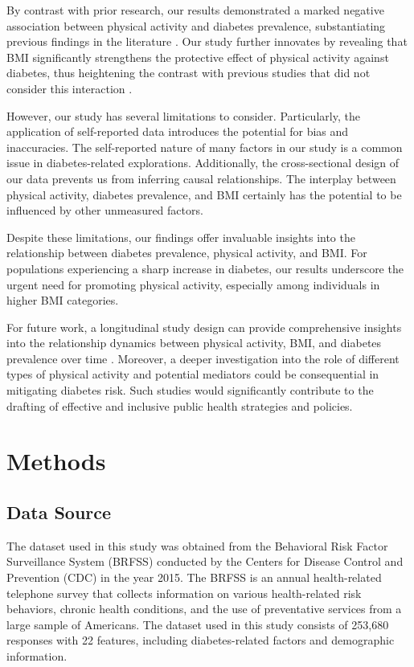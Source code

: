 \documentclass[11pt]{article}
\begin{document}
By contrast with prior research, our results demonstrated a marked negative association between physical activity and diabetes prevalence, substantiating previous findings in the literature \cite{Zhao2020PhysicalAL, Shi2013PhysicalAS}. Our study further innovates by revealing that BMI significantly strengthens the protective effect of physical activity against diabetes, thus heightening the contrast with previous studies that did not consider this interaction \cite{Bohn2015ImpactOP, Pi-Sunyer2007ReductionIW}.

However, our study has several limitations to consider. Particularly, the application of self-reported data introduces the potential for bias and inaccuracies. The self-reported nature of many factors in our study is a common issue in diabetes-related explorations\cite{Akter2014PrevalenceOD}. Additionally, the cross-sectional design of our data prevents us from inferring causal relationships. The interplay between physical activity, diabetes prevalence, and BMI certainly has the potential to be influenced by other unmeasured factors.

Despite these limitations, our findings offer invaluable insights into the relationship between diabetes prevalence, physical activity, and BMI. For populations experiencing a sharp increase in diabetes, our results underscore the urgent need for promoting physical activity, especially among individuals in higher BMI categories. 

For future work, a longitudinal study design can provide comprehensive insights into the relationship dynamics between physical activity, BMI, and diabetes prevalence over time \cite{Chan1994ObesityFD, Singh2013TheAQ, Wild2006RiskFF}. Moreover, a deeper investigation into the role of different types of physical activity and potential mediators could be consequential in mitigating diabetes risk. Such studies would significantly contribute to the drafting of effective and inclusive public health strategies and policies.

\section*{Methods}

\subsection*{Data Source}
The dataset used in this study was obtained from the Behavioral Risk Factor Surveillance System (BRFSS) conducted by the Centers for Disease Control and Prevention (CDC) in the year 2015. The BRFSS is an annual health-related telephone survey that collects information on various health-related risk behaviors, chronic health conditions, and the use of preventative services from a large sample of Americans. The dataset used in this study consists of 253,680 responses with 22 features, including diabetes-related factors and demographic information.
\end{document}
